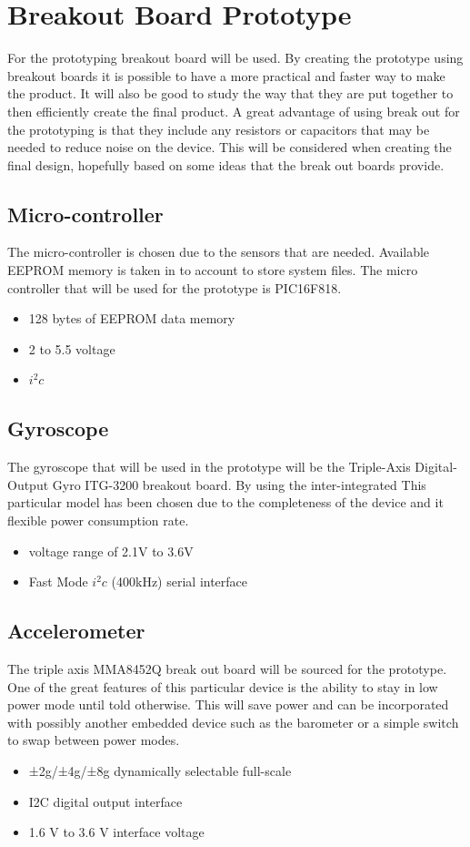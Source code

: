 \documentclass{report}
\begin{document}
\section{Breakout Board Prototype}
For the prototyping breakout board will be used. By creating the prototype using breakout boards it is possible to have a more practical and faster way to make the product. It will also be good to study the way that they are put together to then efficiently create the final product. A great advantage of using break out for the prototyping is that they include any resistors or capacitors that may be needed to reduce noise on the device. This will be considered when creating the final design, hopefully based on some ideas that the break out boards provide.
 
\subsection{Micro-controller}
The micro-controller is chosen due to the sensors that are needed. Available EEPROM memory is taken in to account to store system files. The micro controller that will be used for the prototype is PIC16F818. 
\begin{itemize}
\item 128 bytes of EEPROM data memory
\item 2 to 5.5 voltage
\item $i^2c$
\end{itemize}

\subsection{Gyroscope}
The gyroscope that will be used in the prototype will be the Triple-Axis Digital-Output Gyro ITG-3200 breakout board. By using the inter-integrated 
This particular model has been chosen due to the completeness of the device and it flexible power consumption rate.
\begin{itemize}
\item voltage range of 2.1V to 3.6V
\item Fast Mode $i^2c$ (400kHz) serial interface
\end{itemize}
\subsection{Accelerometer}
The triple axis MMA8452Q break out board will be sourced for the prototype. One of the great features of this particular device is the ability to stay in low power mode until told otherwise. This will save power and can be incorporated with possibly another embedded device such as the barometer or a simple switch to swap between power modes.
\begin{itemize}
\item ±2g/±4g/±8g dynamically selectable full-scale
\item I2C digital output interface
\item 1.6 V to 3.6 V interface voltage
\end{itemize}
\end{document}
